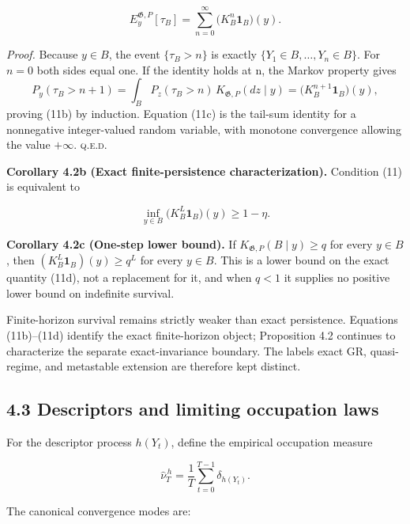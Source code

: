 \documentclass[10pt]{article}
\begin{document}
\begin{equation}
E_y^{\mathfrak G,P}[\tau_B]=\sum_{n=0}^{\infty}\bigl(K_B^n\mathbf 1_B\bigr)(y).
\tag{11c}\label{eq:11c}
\end{equation}

\emph{Proof.} Because \(y\in B\), the event \(\{\tau_B>n\}\) is exactly \(\{Y_1\in B,\ldots,Y_n\in B\}\). For \(n=0\) both sides equal one. If the identity holds at n, the Markov property gives
\[
P_y(\tau_B>n+1)=\int_B P_z(\tau_B>n)\,K_{\mathfrak G,P}(dz\mid y)=\bigl(K_B^{n+1}\mathbf 1_B\bigr)(y),
\]
proving (11b) by induction. Equation (11c) is the tail-sum identity for a nonnegative integer-valued random variable, with monotone convergence allowing the value \(+\infty\). \hfill\textsc{q.e.d.}

\textbf{Corollary 4.2b (Exact finite-persistence characterization).} Condition (11) is equivalent to

\begin{equation}
\inf_{y\in B}\bigl(K_B^L\mathbf 1_B\bigr)(y)\ge 1-\eta.
\tag{11d}\label{eq:11d}
\end{equation}

\textbf{Corollary 4.2c (One-step lower bound).} If \(K_{\mathfrak G,P}(B\mid y)\ge q\) for every \(y\in B\), then \((K_B^L\mathbf 1_B)(y)\ge q^L\) for every \(y\in B\). This is a lower bound on the exact quantity (11d), not a replacement for it, and when \(q<1\) it supplies no positive lower bound on indefinite survival.

Finite-horizon survival remains strictly weaker than exact persistence. Equations (11b)--(11d) identify the exact finite-horizon object; Proposition 4.2 continues to characterize the separate exact-invariance boundary. The labels exact GR, quasi-regime, and metastable extension are therefore kept distinct.

\subsection{4.3 Descriptors and limiting occupation
laws}\label{descriptors-and-limiting-occupation-laws}

For the descriptor process \(h(Y_t)\), define the empirical occupation
measure

\begin{equation}
\widehat\nu_T^{\,h}=\frac{1}{T}\sum_{t=0}^{T-1}\delta_{h(Y_t)}.
\tag{12}\label{eq:12}
\end{equation}

The canonical convergence modes are:
\end{document}
